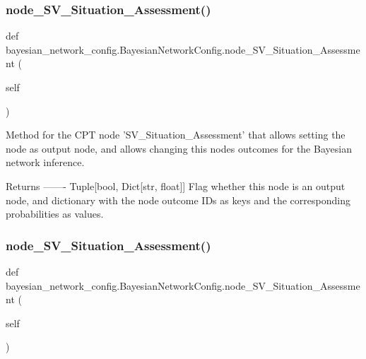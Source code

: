 \subsubsection{\texorpdfstring{node\+\_\+\+S\+V\+\_\+\+Situation\+\_\+\+Assessment()}{node\_SV\_Situation\_Assessment()}\hspace{0.1cm}{\footnotesize\ttfamily [1/2]}}
{\footnotesize\ttfamily def bayesian\+\_\+network\+\_\+config.\+Bayesian\+Network\+Config.\+node\+\_\+\+S\+V\+\_\+\+Situation\+\_\+\+Assessment (\begin{DoxyParamCaption}\item[{}]{self }\end{DoxyParamCaption})}

\begin{DoxyVerb}Method for the CPT node 'SV_Situation_Assessment' that allows setting the node as output node,
and allows changing this nodes outcomes for the Bayesian network inference.

Returns
-------
Tuple[bool, Dict[str, float]]
    Flag whether this node is an output node, and dictionary with the node outcome IDs as keys
    and the corresponding probabilities as values.
\end{DoxyVerb}
 \mbox{\label{classbayesian__network__config_1_1_bayesian_network_config_a542c4ed5d49ca145684cfcff7a6e90f6}} 
\subsubsection{\texorpdfstring{node\+\_\+\+S\+V\+\_\+\+Situation\+\_\+\+Assessment()}{node\_SV\_Situation\_Assessment()}\hspace{0.1cm}{\footnotesize\ttfamily [2/2]}}
{\footnotesize\ttfamily def bayesian\+\_\+network\+\_\+config.\+Bayesian\+Network\+Config.\+node\+\_\+\+S\+V\+\_\+\+Situation\+\_\+\+Assessment (\begin{DoxyParamCaption}\item[{}]{self }\end{DoxyParamCaption})}


